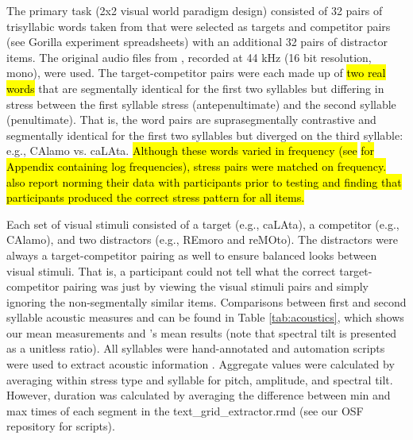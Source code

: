The primary task (2x2 visual world paradigm design) consisted of 32 pairs of trisyllabic words taken from \cite{Sulpizio_McQueen_2012} that were selected as targets and competitor pairs (see Gorilla experiment spreadsheets) with an additional 32 pairs of distractor items. The original audio files from \cite{Sulpizio_McQueen_2012}, recorded at 44 kHz (16 bit resolution, mono), were used. The target-competitor pairs were each made up of \hl{two real words} that are segmentally identical for the first two syllables but differing in stress between the first syllable stress (antepenultimate) and the second syllable (penultimate). That is, the word pairs are suprasegmentally contrastive and segmentally identical for the first two syllables but diverged on the third syllable: e.g., CAlamo vs. caLAta. \hl{Although these words varied in frequency (see} \cite{Sulpizio_McQueen_2012} \hl{for Appendix containing log frequencies), stress pairs were matched on frequency.} \cite{Sulpizio_McQueen_2012} \hl{also report norming their data with participants prior to testing and finding that participants produced the correct stress pattern for all items.}

Each set of visual stimuli consisted of a target (e.g., caLAta), a competitor (e.g., CAlamo), and two distractors (e.g., REmoro and reMOto). The distractors were always a target-competitor pairing as well to ensure balanced looks between visual stimuli. That is, a participant could not tell what the correct target-competitor pairing was just by viewing the visual stimuli pairs and simply ignoring the non-segmentally similar items. Comparisons between first and second syllable acoustic measures and can be found in Table \ref{tab:acoustics}, which shows our mean measurements and \cite{Sulpizio_McQueen_2012}'s mean results (note that spectral tilt is presented as a unitless ratio). All syllables were hand-annotated and automation scripts were used to extract acoustic information \citep{qi_textgrid_maker, dicanio_vowel_acoustics}. Aggregate values were calculated by averaging within stress type and syllable for pitch, amplitude, and spectral tilt. However, duration was calculated by averaging the difference between min and max times of each segment in the text\_grid\_extractor.rmd (see our OSF repository for scripts). 

